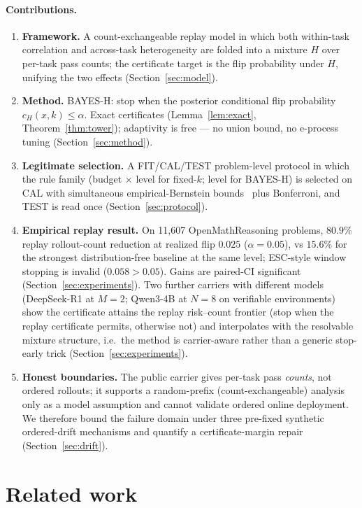 \documentclass{article}
\theoremstyle{definition}
\theoremstyle{remark}
\begin{document}
\paragraph{Contributions.}
\begin{enumerate}[leftmargin=1.6em,itemsep=1pt]
\item \textbf{Framework.} A count-exchangeable replay model in which both
within-task correlation and across-task heterogeneity are folded into a
mixture $H$ over per-task pass counts; the certificate target is the flip
probability under $H$, unifying the two effects (Section~\ref{sec:model}).
\item \textbf{Method.} BAYES-H: stop when the posterior conditional flip
probability $c_H(x,k)\le\alpha$. Exact certificates (Lemma~\ref{lem:exact}, Theorem~\ref{thm:tower}); adaptivity is free --- no union
bound, no e-process tuning (Section~\ref{sec:method}).
\item \textbf{Legitimate selection.} A FIT/CAL/TEST problem-level protocol in
which the rule family (budget $\times$ level for fixed-$k$; level for BAYES-H)
is selected on CAL with simultaneous empirical-Bernstein
bounds~\citep{maurer2009eb} plus Bonferroni, and TEST is read once
(Section~\ref{sec:protocol}).
\item \textbf{Empirical replay result.} On 11{,}607 OpenMathReasoning problems,
$80.9\%$ replay rollout-count reduction at realized flip $0.025$ ($\alpha=0.05$), vs $15.6\%$
for the strongest distribution-free baseline at the same level; ESC-style
window stopping is invalid ($0.058>0.05$). Gains are paired-CI significant
(Section~\ref{sec:experiments}). Two further carriers with different models
(DeepSeek-R1 at $M=2$; Qwen3-4B at $N=8$ on verifiable environments) show the
certificate attains the replay risk--count frontier (stop when the replay
certificate permits, otherwise not)
and interpolates with the resolvable mixture structure, i.e.\ the method is
carrier-aware rather than a generic stop-early trick
(Section~\ref{sec:experiments}).
\item \textbf{Honest boundaries.} The public carrier gives per-task pass
\emph{counts}, not ordered rollouts; it supports a random-prefix
(count-exchangeable) analysis only as a model assumption and cannot validate
ordered online deployment. We therefore bound the failure domain under three
pre-fixed synthetic ordered-drift mechanisms and quantify a certificate-margin repair
(Section~\ref{sec:drift}).
\end{enumerate}

\section{Related work}
\label{sec:related}
\end{document}
